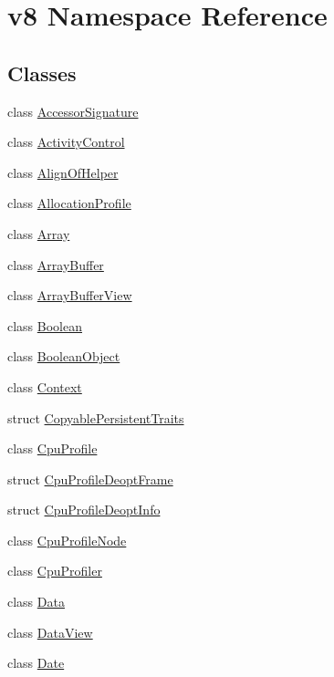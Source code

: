 \hypertarget{namespacev8}{}\section{v8 Namespace Reference}
\label{namespacev8}
\subsection*{Classes}
\begin{DoxyCompactItemize}
\item 
class \hyperlink{classv8_1_1_accessor_signature}{Accessor\+Signature}
\item 
class \hyperlink{classv8_1_1_activity_control}{Activity\+Control}
\item 
class \hyperlink{classv8_1_1_align_of_helper}{Align\+Of\+Helper}
\item 
class \hyperlink{classv8_1_1_allocation_profile}{Allocation\+Profile}
\item 
class \hyperlink{classv8_1_1_array}{Array}
\item 
class \hyperlink{classv8_1_1_array_buffer}{Array\+Buffer}
\item 
class \hyperlink{classv8_1_1_array_buffer_view}{Array\+Buffer\+View}
\item 
class \hyperlink{classv8_1_1_boolean}{Boolean}
\item 
class \hyperlink{classv8_1_1_boolean_object}{Boolean\+Object}
\item 
class \hyperlink{classv8_1_1_context}{Context}
\item 
struct \hyperlink{structv8_1_1_copyable_persistent_traits}{Copyable\+Persistent\+Traits}
\item 
class \hyperlink{classv8_1_1_cpu_profile}{Cpu\+Profile}
\item 
struct \hyperlink{structv8_1_1_cpu_profile_deopt_frame}{Cpu\+Profile\+Deopt\+Frame}
\item 
struct \hyperlink{structv8_1_1_cpu_profile_deopt_info}{Cpu\+Profile\+Deopt\+Info}
\item 
class \hyperlink{classv8_1_1_cpu_profile_node}{Cpu\+Profile\+Node}
\item 
class \hyperlink{classv8_1_1_cpu_profiler}{Cpu\+Profiler}
\item 
class \hyperlink{classv8_1_1_data}{Data}
\item 
class \hyperlink{classv8_1_1_data_view}{Data\+View}
\item 
class \hyperlink{classv8_1_1_date}{Date}
\item 

\end{DoxyCompactItemize}
